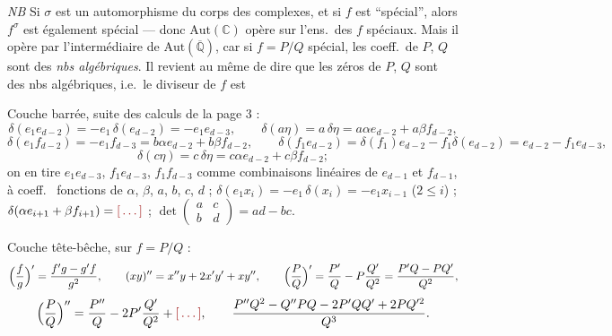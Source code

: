 \documentclass[11pt,a4paper]{article}
\begin{document}
\emph{NB} Si $\sigma$ est un automorphisme du corps des complexes, et si
$f$ est “spécial”, alors $f^{\sigma}$ est également spécial — donc
$\mathrm{Aut}(\mathbb{C})$ opère sur l'ens.\ des $f$ spéciaux. Mais il opère
par l'intermédiaire de $\mathrm{Aut}(\overline{\mathbb{Q}})$, car si
$f=P/Q$ spécial, les coeff.\ de $P$, $Q$ sont des \emph{nbs algébriques}. Il
revient au même de dire que les zéros de $P$, $Q$ sont des nbs algébriques,
i.e.\ le diviseur de $f$ est


Couche barrée, suite des calculs de la page 3 :
\[
\delta(e_1e_{d-2}) = -e_1\,\delta(e_{d-2}) = -e_1e_{d-3}, \qquad
\delta(a\eta) = a\,\delta\eta = a\alpha e_{d-2} + a\beta f_{d-2},
\]
\[
\delta(e_1f_{d-2}) = -e_1f_{d-3} = b\alpha e_{d-2} + b\beta f_{d-2},\qquad
\delta(f_1e_{d-2}) = \delta(f_1)e_{d-2} - f_1\delta(e_{d-2}) =
e_{d-2} - f_1e_{d-3},
\]
\[
\delta(c\eta) = c\,\delta\eta = c\alpha e_{d-2} + c\beta f_{d-2} ;
\]
on en tire $e_1e_{d-3}$, $f_1e_{d-3}$, $f_1f_{d-3}$ comme combinaisons
linéaires de $e_{d-1}$ et $f_{d-1}$, à coeff.\ \ill{} fonctions de
$\alpha$, $\beta$, $a$, $b$, $c$, $d$ ;
$\delta(e_1x_i) = -e_1\,\delta(x_i) = -e_1x_{i-1}$ ($2\leq i$) ;
$\delta(\alpha e_{i+1} + \beta f_{i+1}) = \ill{}$ ;
$\det\begin{pmatrix} a & c\\ b & d\end{pmatrix} = ad-bc$.

Couche tête-bêche, sur $f = P/Q$ :
\[
\Bigl(\frac{f}{g}\Bigr)' = \frac{f'g-g'f}{g^2}, \qquad
(xy)'' = x''y + 2x'y' + xy'', \qquad
\Bigl(\frac{P}{Q}\Bigr)' = \frac{P'}{Q} - P\frac{Q'}{Q^2} =
\frac{P'Q-PQ'}{Q^2},
\]
\[
\Bigl(\frac{P}{Q}\Bigr)'' = \frac{P''}{Q} - 2P'\frac{Q'}{Q^2} + \ill{}, \qquad
\frac{P''Q^2 - Q''PQ - 2P'QQ' + 2PQ'^2}{Q^3} .
\]

\end{document}
